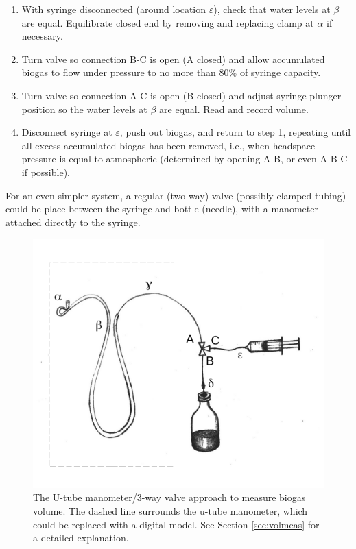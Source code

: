 \documentclass[]{article}
\begin{document}
\begin{enumerate}
  \item With syringe disconnected (around location $\varepsilon$), check that water levels at $\beta$ are equal. Equilibrate closed end by removing and replacing clamp at $\alpha$ if necessary.
  \item Turn valve so connection B-C is open (A closed) and allow accumulated biogas to flow under pressure to no more than 80\% of syringe capacity.
  \item Turn valve so connection A-C is open (B closed) and adjust syringe plunger position so the water levels at $\beta$ are equal. Read and record volume.
  \item Disconnect syringe at $\varepsilon$, push out biogas, and return to step 1, repeating until all excess accumulated biogas has been removed, i.e., when headspace pressure is equal to atmospheric (determined by opening A-B, or even A-B-C if possible).
\end{enumerate}

For an even simpler system, a regular (two-way) valve (possibly clamped tubing) could be place between the syringe and bottle (needle), with a manometer attached directly to the syringe.

\begin{figure}
  \includegraphics[]{figs/GD_utube.pdf}
  \caption{The U-tube manometer/3-way valve approach to measure biogas volume. The dashed line surrounds the u-tube manometer, which could be replaced with a digital model. See Section \ref{sec:volmeas} for a detailed explanation.} 
  \label{fig:utube}
\end{figure}
\end{document}
